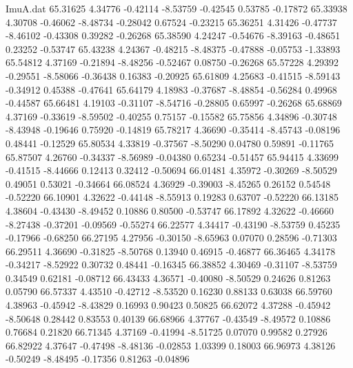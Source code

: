 \begin{filecontents}{ImuA.dat}
  65.31625    4.34776   -0.42114   -8.53759   -0.42545    0.53785   -0.17872
  65.33938    4.30708   -0.46062   -8.48734   -0.28042    0.67524   -0.23215
  65.36251    4.31426   -0.47737   -8.46102   -0.43308    0.39282   -0.26268
  65.38590    4.24247   -0.54676   -8.39163   -0.48651    0.23252   -0.53747
  65.43238    4.24367   -0.48215   -8.48375   -0.47888   -0.05753   -1.33893
  65.54812    4.37169   -0.21894   -8.48256   -0.52467    0.08750   -0.26268
  65.57228    4.29392   -0.29551   -8.58066   -0.36438    0.16383   -0.20925
  65.61809    4.25683   -0.41515   -8.59143   -0.34912    0.45388   -0.47641
  65.64179    4.18983   -0.37687   -8.48854   -0.56284    0.49968   -0.44587
  65.66481    4.19103   -0.31107   -8.54716   -0.28805    0.65997   -0.26268
  65.68869    4.37169   -0.33619   -8.59502   -0.40255    0.75157   -0.15582
  65.75856    4.34896   -0.30748   -8.43948   -0.19646    0.75920   -0.14819
  65.78217    4.36690   -0.35414   -8.45743   -0.08196    0.48441   -0.12529
  65.80534    4.33819   -0.37567   -8.50290    0.04780    0.59891   -0.11765
  65.87507    4.26760   -0.34337   -8.56989   -0.04380    0.65234   -0.51457
  65.94415    4.33699   -0.41515   -8.44666    0.12413    0.32412   -0.50694
  66.01481    4.35972   -0.30269   -8.50529    0.49051    0.53021   -0.34664
  66.08524    4.36929   -0.39003   -8.45265    0.26152    0.54548   -0.52220
  66.10901    4.32622   -0.44148   -8.55913    0.19283    0.63707   -0.52220
  66.13185    4.38604   -0.43430   -8.49452    0.10886    0.80500   -0.53747
  66.17892    4.32622   -0.46660   -8.27438   -0.37201   -0.09569   -0.55274
  66.22577    4.34417   -0.43190   -8.53759    0.45235   -0.17966   -0.68250
  66.27195    4.27956   -0.30150   -8.65963    0.07070    0.28596   -0.71303
  66.29511    4.36690   -0.31825   -8.50768    0.13940    0.46915   -0.46877
  66.36465    4.34178   -0.34217   -8.52922    0.30732    0.48441   -0.16345
  66.38852    4.30469   -0.31107   -8.53759    0.34549    0.62181   -0.08712
  66.43433    4.36571   -0.40080   -8.50529    0.24626    0.81263    0.05790
  66.57337    4.43510   -0.42712   -8.53520    0.16230    0.88133    0.63038
  66.59760    4.38963   -0.45942   -8.43829    0.16993    0.90423    0.50825
  66.62072    4.37288   -0.45942   -8.50648    0.28442    0.83553    0.40139
  66.68966    4.37767   -0.43549   -8.49572    0.10886    0.76684    0.21820
  66.71345    4.37169   -0.41994   -8.51725    0.07070    0.99582    0.27926
  66.82922    4.37647   -0.47498   -8.48136   -0.02853    1.03399    0.18003
  66.96973    4.38126   -0.50249   -8.48495   -0.17356    0.81263   -0.04896

\end{filecontents}
